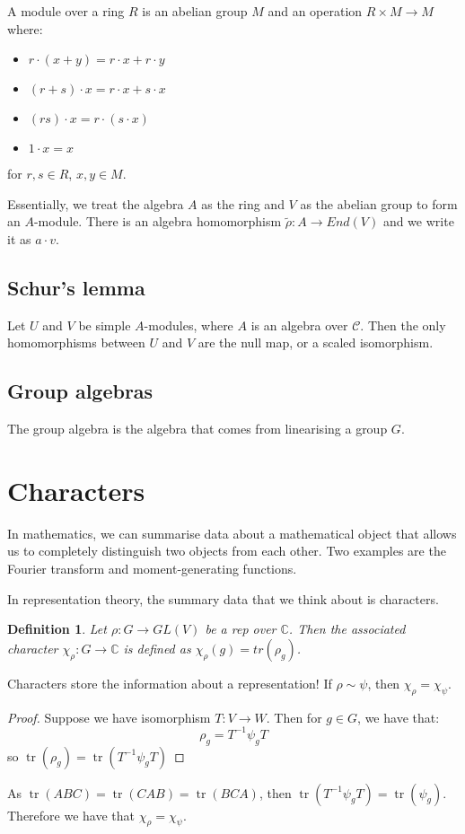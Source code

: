 \documentclass[]{report}
\newtheorem{definition}[theorem]{Definition}
\theoremstyle{definition}
\numberwithin{theorem}{section}
\numberwithin{equation}{section}
\newcommand{\tr}{\operatorname{tr}}
\begin{document}
A module over a ring $R$ is an abelian group $M$ and an operation $R \times M \rightarrow M$ where:
\begin{itemize}
	\item $r \cdot (x + y) = r \cdot x + r \cdot y$
	\item $(r + s) \cdot x = r \cdot x + s \cdot x$
	\item $(rs )\cdot x = r \cdot (s \cdot x)$
	\item $1 \cdot x = x$
\end{itemize}
for $r, s \in R$, $x, y \in M$.

Essentially, we treat the algebra $A$ as the ring and $V$ as the abelian group to form an $A$-module. There is an algebra homomorphism $\tilde{\rho}: A \rightarrow End(V)$ and we write it as $a \cdot v$. 


\subsection{Schur's lemma}
Let $U$ and $V$ be simple $A$-modules, where $A$ is an algebra over $\mathcal{C}$. Then the only homomorphisms between $U$ and $V$ are the null map, or a scaled isomorphism.

\subsection{Group algebras}

The group algebra is the algebra that comes from linearising a group $G$. 

\section{Characters}
In mathematics, we can summarise data about a mathematical object that allows us to completely distinguish two objects from each other. Two examples are the Fourier transform and moment-generating functions. 

In representation theory, the summary data that we think about is characters.

\begin{definition}
	Let $\rho : G \rightarrow GL(V)$ be a rep over $\mathbb{C}$. Then the associated character $\chi_\rho : G \rightarrow \mathbb{C}$ is defined as $\chi_\rho(g) = tr(\rho_g)$. 
\end{definition}
Characters store the information about a representation!
If $\rho \sim \psi$, then $\chi_\rho = \chi_\psi$. 
\begin{proof}
	Suppose we have isomorphism $T: V \rightarrow W$. Then for $g \in G$, we have that:
	\begin{equation}
		\rho_g = T^{-1} \psi_g T
	\end{equation}
	so $\tr(\rho_g) = \tr(T^{-1} \psi_g T)$
\end{proof}
As $\tr(A B C) = \tr(C A B) = \tr(B C A)$, then $\tr(T^{-1} \psi_g T) = \tr(\psi_g)$. Therefore we have that $\chi_\rho = \chi_\psi$. 
\end{document}
